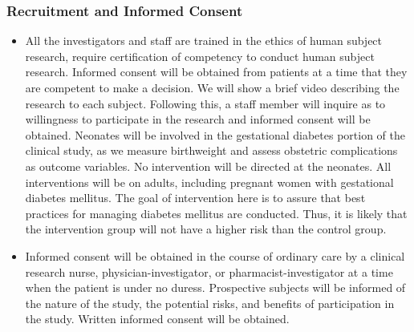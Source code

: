 \documentclass{article}
\begin{document}
\subsubsection{Recruitment and Informed Consent}
\begin{itemize}
\item All the investigators and staff are trained in the ethics of human subject research, require certification of competency to conduct human subject research. Informed consent will be obtained from patients at a time that they are competent to make a decision. We will show a brief video describing the research to each subject. Following this, a staff member will inquire as to willingness to participate in the research and informed consent will be obtained. Neonates will be involved in the gestational diabetes portion of the clinical study, as we measure birthweight and assess obstetric complications as outcome variables. No intervention will be directed at the neonates. All interventions will be on adults, including pregnant women with gestational diabetes mellitus. The goal of intervention here is to assure that best practices for managing diabetes mellitus are conducted. Thus, it is likely that the intervention group will not have a higher risk than the control group.
\item Informed consent will be obtained in the course of ordinary care by a clinical research nurse, physician-investigator, or pharmacist-investigator at a time when the patient is under no duress. Prospective subjects will be informed of the nature of the study, the potential risks, and benefits of participation in the study. Written informed consent will be obtained.
\end{itemize}
\end{document}
